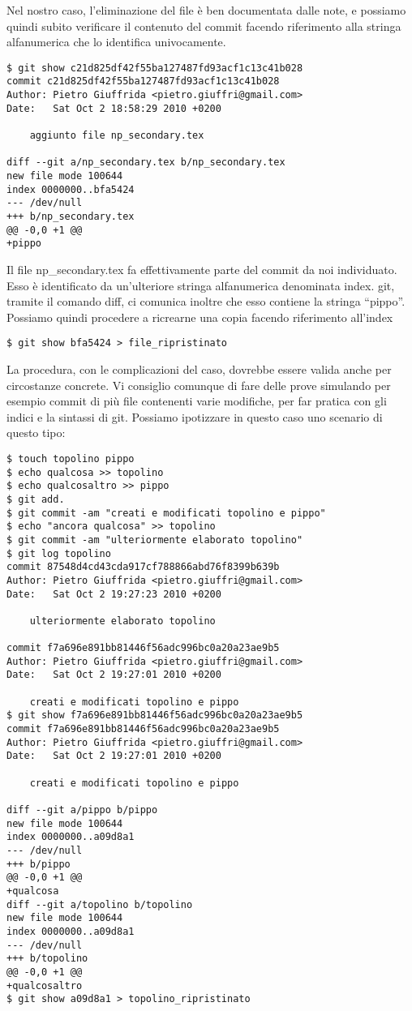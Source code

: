 \documentclass[a4paper,12pt,oneside]{article}
\begin{document}
Nel nostro caso, l'eliminazione del file è ben documentata dalle note, e
possiamo quindi subito verificare il contenuto del commit facendo riferimento
alla stringa alfanumerica che lo identifica univocamente.

\begin{lstlisting}
$ git show c21d825df42f55ba127487fd93acf1c13c41b028
commit c21d825df42f55ba127487fd93acf1c13c41b028
Author: Pietro Giuffrida <pietro.giuffri@gmail.com>
Date:   Sat Oct 2 18:58:29 2010 +0200

    aggiunto file np_secondary.tex

diff --git a/np_secondary.tex b/np_secondary.tex
new file mode 100644
index 0000000..bfa5424
--- /dev/null
+++ b/np_secondary.tex
@@ -0,0 +1 @@
+pippo
\end{lstlisting}

Il file np\_secondary.tex fa effettivamente parte del commit da noi
individuato. Esso è identificato da un'ulteriore stringa alfanumerica
denominata index. git, tramite il comando diff, ci comunica inoltre che esso
contiene la stringa ``pippo''.
Possiamo quindi procedere a ricrearne una copia facendo riferimento all'index

\begin{lstlisting}
$ git show bfa5424 > file_ripristinato
\end{lstlisting}

La procedura, con le complicazioni del caso, dovrebbe essere valida anche per
circostanze concrete. Vi consiglio comunque di fare delle prove simulando per
esempio commit di più file contenenti varie modifiche, per far pratica con gli
indici e la sintassi di git.
Possiamo ipotizzare in questo caso uno scenario di questo tipo:

\begin{lstlisting}
$ touch topolino pippo
$ echo qualcosa >> topolino
$ echo qualcosaltro >> pippo
$ git add.
$ git commit -am "creati e modificati topolino e pippo"
$ echo "ancora qualcosa" >> topolino
$ git commit -am "ulteriormente elaborato topolino"
$ git log topolino
commit 87548d4cd43cda917cf788866abd76f8399b639b
Author: Pietro Giuffrida <pietro.giuffri@gmail.com>
Date:   Sat Oct 2 19:27:23 2010 +0200

    ulteriormente elaborato topolino

commit f7a696e891bb81446f56adc996bc0a20a23ae9b5
Author: Pietro Giuffrida <pietro.giuffri@gmail.com>
Date:   Sat Oct 2 19:27:01 2010 +0200

    creati e modificati topolino e pippo
$ git show f7a696e891bb81446f56adc996bc0a20a23ae9b5
commit f7a696e891bb81446f56adc996bc0a20a23ae9b5
Author: Pietro Giuffrida <pietro.giuffri@gmail.com>
Date:   Sat Oct 2 19:27:01 2010 +0200

    creati e modificati topolino e pippo

diff --git a/pippo b/pippo
new file mode 100644
index 0000000..a09d8a1
--- /dev/null
+++ b/pippo
@@ -0,0 +1 @@
+qualcosa
diff --git a/topolino b/topolino
new file mode 100644
index 0000000..a09d8a1
--- /dev/null
+++ b/topolino
@@ -0,0 +1 @@
+qualcosaltro
$ git show a09d8a1 > topolino_ripristinato
\end{lstlisting}
\end{document}
